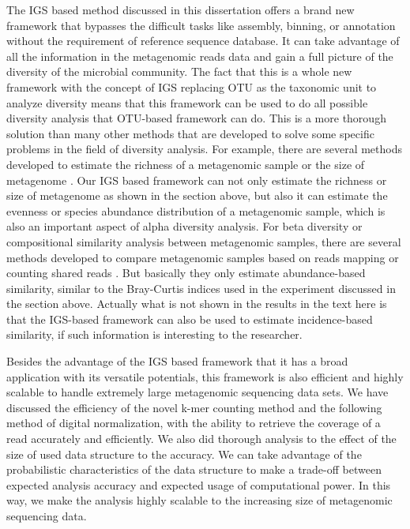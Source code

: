The IGS based
method discussed in this dissertation offers a brand new framework that
bypasses the difficult tasks like assembly, binning, or annotation without the
requirement of reference sequence database. It can take advantage of all the 
information in the metagenomic reads data and gain a full picture of the
diversity of the microbial community. The fact that this is a whole new
framework with the concept of IGS replacing OTU as the taxonomic unit to
analyze diversity means that this framework can be used to do all possible
diversity analysis that OTU-based framework can do. This is a more thorough
solution than many other methods that are developed to solve some specific
problems in the field of diversity analysis. For example, there are several
methods developed to estimate the richness of a metagenomic sample or the size 
of metagenome \cite{Rodriguez-R2014}. Our IGS based framework can not only
estimate the richness or size of metagenome as shown in the section above, but
also it can estimate the evenness or species abundance distribution of a
metagenomic sample, which is also an important aspect of alpha diversity
analysis. For beta diversity or compositional similarity analysis between
metagenomic samples, there are several methods developed to compare metagenomic
samples based on reads mapping or counting shared reads \cite{Rodriguez-R:2013aa}.
But basically they only estimate abundance-based similarity, similar to
the Bray-Curtis indices used in the experiment discussed in the section above.
Actually what is not shown in the results in the text here is that the 
IGS-based framework can also be used to estimate incidence-based similarity, if
such information is interesting to the researcher.

Besides the advantage of the IGS based framework that it has a broad
application with its versatile potentials, this framework is also efficient and
highly scalable to handle extremely large metagenomic sequencing data
sets. We have discussed the efficiency of the novel k-mer counting method and
the following method of digital normalization, with the ability to retrieve the
coverage of a read accurately and efficiently. We also did thorough analysis
to the effect of the size of used data structure to the accuracy. We can take
advantage of the probabilistic characteristics of the data structure to make a
trade-off between expected analysis accuracy and expected usage of
computational power. In this way, we make the analysis highly scalable to
the increasing size of metagenomic sequencing data.  

